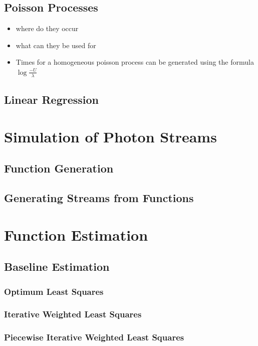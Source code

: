 \documentclass[a4paper,11pt]{article}
\begin{document}
\subsection{Poisson Processes}
\label{sec-2-2}

\begin{itemize}
\item where do they occur
\item what can they be used for
\item Times for a homogeneous poisson process can be generated using
     the formula $\log\frac{-U}{\lambda}$
\end{itemize}
\subsection{Linear Regression}
\label{sec-2-3}
\section{Simulation of Photon Streams}
\label{sec-3}
\subsection{Function Generation}
\label{sec-3-1}
\subsection{Generating Streams from Functions}
\label{sec-3-2}
\section{Function Estimation}
\label{sec-4}
\subsection{Baseline Estimation}
\label{sec-4-1}
\subsubsection{Optimum Least Squares}
\label{sec-4-1-1}
\subsubsection{Iterative Weighted Least Squares}
\label{sec-4-1-2}
\subsubsection{Piecewise Iterative Weighted Least Squares}
\label{sec-4-1-3}
\end{document}
